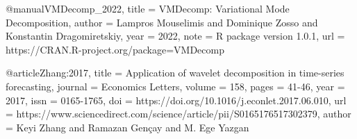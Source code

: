 @manual{VMDecomp_2022,
  title = {VMDecomp: Variational Mode Decomposition},
  author = {Lampros Mouselimis and Dominique Zosso and Konstantin Dragomiretskiy},
  year = {2022},
  note = {R package version 1.0.1},
  url = {https://CRAN.R-project.org/package=VMDecomp}
}

@article{Zhang:2017,
title = {Application of wavelet decomposition in time-series forecasting},
journal = {Economics Letters},
volume = {158},
pages = {41-46},
year = {2017},
issn = {0165-1765},
doi = {https://doi.org/10.1016/j.econlet.2017.06.010},
url = {https://www.sciencedirect.com/science/article/pii/S0165176517302379},
author = {Keyi Zhang and Ramazan Gençay and M. {Ege Yazgan}}
}